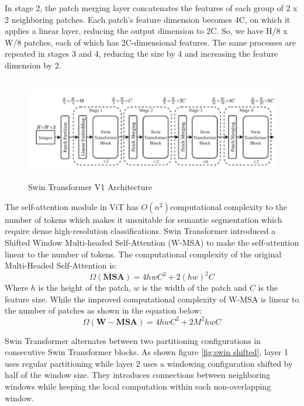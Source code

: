 In stage 2, the patch merging layer concatenates the features of each group of 2 x 2 neighboring patches. Each patch’s feature dimension becomes 4C, on which it applies a linear layer, reducing the output dimension to 2C. So, we have H/8 x W/8 patches, each of which has 2C-dimensional features. The same processes are repeated in stages 3 and 4, reducing the size by 4 and increasing the feature dimension by 2.

\FloatBarrier
\begin{figure}[ht]
\includegraphics[width=11.5cm, height=4.5cm]{images/swin-transformer-4block.png}
\centering
\caption{Swin Transformer V1 Architecture \protect\cite{swin-v1}}
\label{fig:swin architecture1}
\end{figure}

The self-attention module in ViT has $O(n^2) $computational complexity to the number of tokens which makes it unsuitable for semantic segmentation which require dense high-resolution classifications. Swin Transformer introduced a Shifted Window Multi-headed Self-Attention (W-MSA) to make the self-attention linear to the number of tokens. The computational complexity of the original Multi-Headed Self-Attention is:
\begin{equation}
    \Omega (\mathbf{MSA}) = 4hwC^2 + 2(hw)^2C
\end{equation}
Where $h$ is the height of the patch, $w$ is the width of the patch and $C$ is the feature size. While the improved computational complexity of W-MSA is linear to the number of patches as shown in the equation below:
\begin{equation}
    \Omega (\mathbf{W-MSA}) = 4hwC^2 + 2M^2hwC
\end{equation}

Swin Transformer alternates between two partitioning configurations in consecutive Swin Transformer blocks. As shown figure \ref{fig:swin shifted}, layer 1 uses regular partitioning while layer 2 uses a windowing configuration shifted by half of the window size. They introduces connections between neighboring windows while keeping the local computation within each non-overlapping window.

